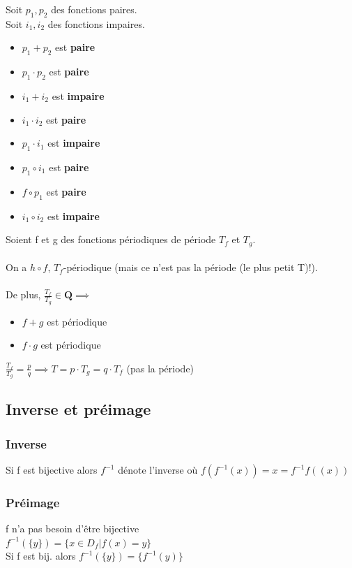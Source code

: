 \documentclass{article}
\begin{document}
Soit $ p_1, p_2 $ des fonctions paires.\\
Soit $ i_1, i_2 $ des fonctions impaires.

\begin{itemize}
    \item $ p_1 + p_2 $ est \textbf{paire}
    \item $ p_1 \cdot p_2 $ est \textbf{paire}
    \item $ i_1 + i_2 $ est \textbf{impaire}
    \item $ i_1 \cdot i_2 $ est \textbf{paire}
    \item $ p_1 \cdot i_1 $ est \textbf{impaire}
    \item $ p_1 \circ i_1 $ est \textbf{paire}
    \item $ f \circ p_1 $ est \textbf{paire}
    \item $ i_1 \circ i_2 $ est \textbf{impaire}
\end{itemize}
Soient f et g des fonctions périodiques de période $ T_f $ et $ T_g $.\\\\
On a $ h\circ f$, $ T_f $-périodique (mais ce n'est pas la période (le plus petit T)!).\\\\
De plus, $ \frac{T_f}{T_g} \in \mathbf{Q} \implies $

\begin{itemize}
    \item $ f + g $ est périodique
    \item $ f \cdot g $ est périodique
\end{itemize}
$\frac{T_f}{T_g} = \frac{p}{q} \implies T = p \cdot T_g = q \cdot T_f$ (pas la période)
\subsection{Inverse et préimage}

\subsubsection{Inverse}

Si f est bijective alors $ f^{-1} $ dénote l'inverse où $ f(f^{-1}(x)) = x = f^{-1}f((x))$
\subsubsection{Préimage}

f n'a pas besoin d'être bijective\\
$ f^{-1}(\{y\}) = \{ x \in D_f | f(x) = y\}$\\
Si f est bij. alors $ f^{-1}(\{y\}) = \{f^{-1}(y)\} $
\end{document}
